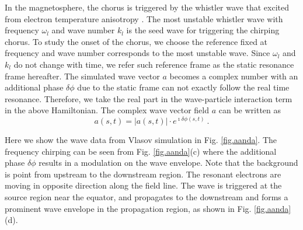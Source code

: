 In the magnetosphere, the chorus is triggered by the whistler wave \cite{omura_theory_2008,tao_theoretical_2020} that excited from electron temperature anisotropy \cite{gary_1993}. 
The most unstable whistler wave with frequency $\omega_l$ and wave number $k_l$ is the seed wave for triggering the chirping chorus.
To study the onset of the chorus, we choose the reference fixed at frequency and wave number corresponds to the most unstable wave. 
Since $\omega_l$ and $k_l$ do not change with time, we refer such reference frame as the static resonance frame hereafter. 
The simulated wave vector $a$ becomes a complex number with an additional phase $\delta \phi$ due to the static frame can not exactly follow the real time resonance. Therefore, we take the real part in the wave-particle interaction term in the above Hamiltonian.
The complex wave vector field $a$ can be written as 
\begin{equation}
    a(s,t) = |a(s,t)| \cdot e^{\imath \delta \phi(s,t)}~.
\end{equation}

Here we show the wave data from Vlasov simulation in Fig. \ref{fig.aanda}.
The frequency chirping can be seen from Fig. \ref{fig.aanda}(c) where the additional phase $\delta \phi$ results in a modulation on the wave envelope.
Note that the background is point from upstream to the downstream region.
The resonant electrons are moving in opposite direction along the field line.
The wave is triggered at the source region near the equator, and propagates to the downstream and forms a prominent wave envelope in the propagation region, as shown in Fig. \ref{fig.aanda}(d).



